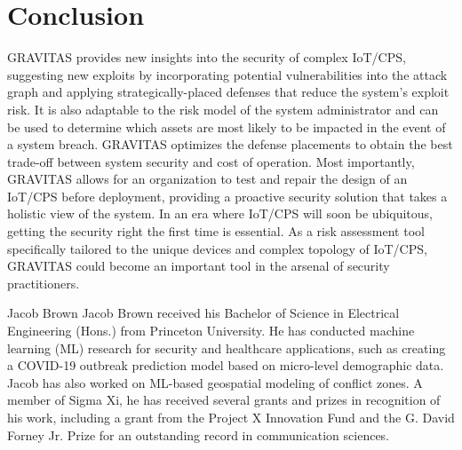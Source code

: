 \documentclass[10pt,journal,compsoc]{IEEEtran}
\begin{document}
\section{Conclusion}
\label{section:conclusion}

GRAVITAS provides new insights into the security of complex IoT/CPS, suggesting new exploits by incorporating potential vulnerabilities into the attack graph and applying strategically-placed defenses that reduce the system's exploit risk. It is also adaptable to the risk model of the system administrator and can be used to determine which assets are most likely to be impacted in the event of a system breach. GRAVITAS optimizes the defense placements to obtain the best trade-off between system security and cost of operation. Most importantly, GRAVITAS allows for an organization to test and repair the design of an IoT/CPS before deployment, providing a proactive security 
solution that takes a holistic view of the system. In an era where IoT/CPS will soon be ubiquitous, 
getting the security right the first time is essential. As a risk assessment tool specifically tailored to 
the unique devices and complex topology of IoT/CPS, GRAVITAS could become an important tool in the 
arsenal of security practitioners.


\ifCLASSOPTIONcaptionsoff
  \newpage
\fi




\newpage
\begin{IEEEbiography}{Jacob Brown}
Jacob Brown received his Bachelor of Science in Electrical Engineering (Hons.) from Princeton 
University. He has conducted machine learning (ML) research for security and healthcare applications, 
such as creating a COVID-19 outbreak prediction model based on micro-level demographic data. Jacob 
has also worked on ML-based geospatial modeling of conflict zones. A member of Sigma Xi, he has 
received several grants and prizes in recognition of his work, including a grant from the Project X 
Innovation Fund and the G. David Forney Jr. Prize for an outstanding record in communication 
sciences.
\end{IEEEbiography}
\end{document}
